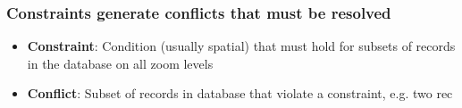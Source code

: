 \documentclass{beamer}
\begin{document}
\frame
{
  \frametitle{Constraints generate conflicts that must be resolved}
  \begin{itemize}
  \item \textbf{Constraint}: Condition (usually spatial) that must hold for subsets of records in the database on all zoom levels
  \item \textbf{Conflict}: Subset of records in database that violate a constraint, e.g. two rec
\end{itemize}}
\end{document}
